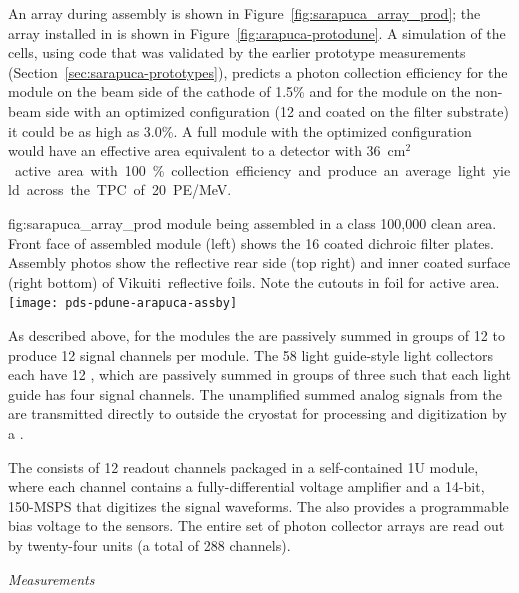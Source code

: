 An  array during assembly is shown in Figure~\ref{fig:sarapuca_array_prod}; the array installed in  is shown in Figure~\ref{fig:arapuca-protodune}. 
A simulation of the  cells, using code that was validated by the earlier prototype measurements (Section~\ref{sec:sarapuca-prototypes}), predicts a photon collection efficiency for the module on the beam side of the cathode of 1.5\% and for the module on the non-beam side with an optimized configuration (\num{12}  and  coated on the filter substrate) it could be as high as 3.0\%. A full  module with the optimized configuration would have an effective area equivalent to a detector with \SI{36}{cm$^2$} active area with 100\% collection efficiency and produce an average light yield across the TPC of \SI{20}{PE/MeV}.


\begin{dunefigure}{fig:sarapuca_array_prod}
{  module being assembled in a class 100,000 clean area.  Front face of assembled module (left) shows the 16 coated dichroic filter plates.  Assembly photos show the reflective rear side (top right) and inner coated surface (right bottom) of Vikuiti\texttrademark\ reflective foils.  Note the cutouts in foil for  active area.}
	\texttt{[image: pds-pdune-arapuca-assby]}
\end{dunefigure}


As described above, for the  modules the  are passively summed in groups of 12 to produce 12 signal channels per module. The 58 light guide-style light collectors each have 12 , which are passively summed in groups of three such that each light guide has four signal channels. 
The unamplified summed analog signals from the  are transmitted directly to outside the cryostat for processing and digitization by a
.

The  consists of 12 readout channels packaged in  a self-contained 1U module, where each channel contains a fully-differential voltage amplifier and a \num{14}-bit, \num{150}-MSPS  that digitizes the  signal waveforms. The  also provides a programmable bias voltage to the sensors.
The entire set of photon collector arrays are read out by twenty-four  units (a total of 288 channels).


\textit{  Measurements}
\label{sec:protodune-results}

